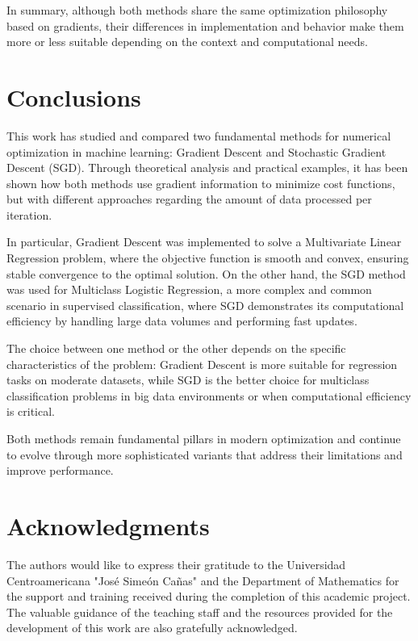 \documentclass[12pt, letterpaper,conference]{IEEEtran}
\begin{document}
\vspace{0.15cm}
In summary, although both methods share the same optimization philosophy based on gradients, their differences in implementation and behavior make them more or less suitable depending on the context and computational needs.

\vspace{0.25cm}

\section{Conclusions}

This work has studied and compared two fundamental methods for numerical optimization in machine learning: Gradient Descent and Stochastic Gradient Descent (SGD). Through theoretical analysis and practical examples, it has been shown how both methods use gradient information to minimize cost functions, but with different approaches regarding the amount of data processed per iteration.

In particular, Gradient Descent was implemented to solve a Multivariate Linear Regression problem, where the objective function is smooth and convex, ensuring stable convergence to the optimal solution. On the other hand, the SGD method was used for Multiclass Logistic Regression, a more complex and common scenario in supervised classification, where SGD demonstrates its computational efficiency by handling large data volumes and performing fast updates.

The choice between one method or the other depends on the specific characteristics of the problem: Gradient Descent is more suitable for regression tasks on moderate datasets, while SGD is the better choice for multiclass classification problems in big data environments or when computational efficiency is critical.

Both methods remain fundamental pillars in modern optimization and continue to evolve through more sophisticated variants that address their limitations and improve performance.

\vspace{0.25cm}

\section*{Acknowledgments}

The authors would like to express their gratitude to the Universidad Centroamericana "José Simeón Cañas" and the Department of Mathematics for the support and training received during the completion of this academic project. The valuable guidance of the teaching staff and the resources provided for the development of this work are also gratefully acknowledged.
\end{document}
